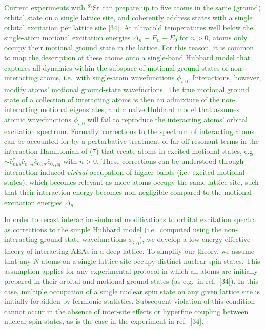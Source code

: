 \documentclass[preprint]{revtex4-1}
\renewcommand{\c}{\hat{c}}
\newcommand{\1}{\mathds{1}}
\newcommand{\green}[1]{\textcolor{green}{#1}}
\newcounter{point}
\begin{document}
\begin{enumerate}[label=(R1.\arabic{point}.\arabic*)]
  \green{Current experiments with ${}^{87}$Sr can prepare up to five
    atoms in the same (ground) orbital state on a single lattice site,
    and coherently address states with a single orbital excitation per
    lattice site [34].  At ultracold temperatures well below the
    single-atom motional excitation energies $\Delta_n\equiv E_n-E_0$
    for $n>0$, atoms only occupy their motional ground state in the
    lattice.  For this reason, it is common to map the description of
    these atoms onto a single-band Hubbard model that captures all
    dynamics within the subspace of motional ground states of
    non-interacting atoms, i.e.~with single-atom wavefunctions
    $\phi_{i,0}$.  Interactions, however, modify atoms' motional
    ground-state wavefuctions.  The true motional ground state of a
    collection of interacting atoms is then an admixture of the
    non-interacting motional eigenstates, and a naive Hubbard model
    that assumes atomic wavefunctions $\phi_{i,0}$ will fail to
    reproduce the interacting atoms' orbital excitation spectrum.
    Formally, corrections to the spectrum of interacting atoms can be
    accounted for by a perturbative treatment of far-off-resonant
    terms in the interaction Hamiltonian of (7) that create atoms in
    excited motional states,
    e.g.~$\sim\c_{n\mu s}^\dag \c_{0,\nu t}^\dag \c_{0,\nu r}
    \c_{0,\mu q}$ with $n>0$.  These corrections can be understood
    through interaction-induced {\it virtual} occupation of higher
    bands (i.e.~excited motional states), which becomes relevant as
    more atoms occupy the same lattice site, such that their
    interaction energy becomes non-negligible compared to the motional
    excitation energies $\Delta_n$.}

  \green{In order to recast interaction-induced modifications to
    orbital excitation spectra as corrections to the simple Hubbard
    model (i.e.~computed using the non-interacting ground-state
    wavefunctions $\phi_{i,0}$), we develop a low-energy effective
    theory of interacting AEAs in a deep lattice.  To simplify our
    theory, we assume that any $N$ atoms on a single lattice site
    occupy distinct nuclear spin states.  This assumption applies for
    any experimental protocol in which all atoms are initially
    prepared in their orbital and motional ground states (as e.g.~in
    ref.~[34]).  In this case, multiple occupation of a single nuclear
    spin state on any given lattice site is initially forbidden by
    fermionic statistics.  Subsequent violation of this condition
    cannot occur in the absence of inter-site effects or hyperfine
    coupling between nuclear spin states, as is the case in the
    experiment in ref.~[34].}



\end{enumerate}
\end{document}
